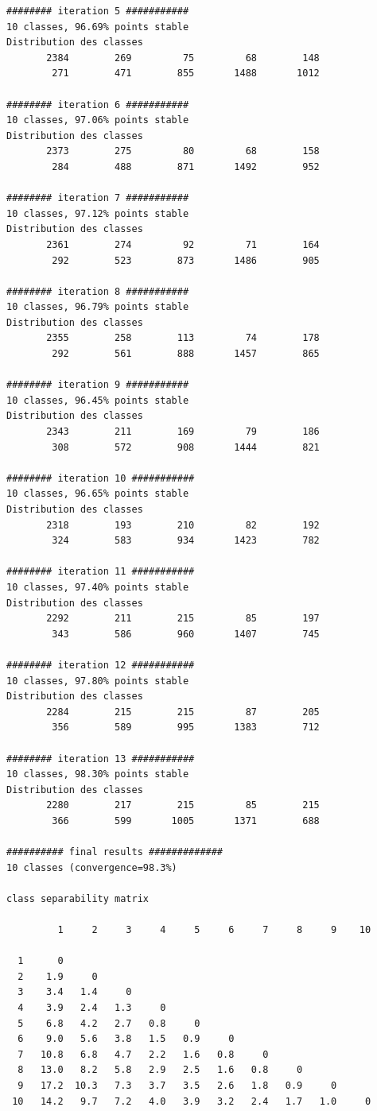 \documentclass[land,article,submit,pdftex,moreauthors]{Definitions/mdpi}
\begin{document}
\begin{scriptsize}
\begin{verbatim}
######## iteration 5 ###########
10 classes, 96.69% points stable
Distribution des classes
       2384        269         75         68        148
        271        471        855       1488       1012

######## iteration 6 ###########
10 classes, 97.06% points stable
Distribution des classes
       2373        275         80         68        158
        284        488        871       1492        952

######## iteration 7 ###########
10 classes, 97.12% points stable
Distribution des classes
       2361        274         92         71        164
        292        523        873       1486        905

######## iteration 8 ###########
10 classes, 96.79% points stable
Distribution des classes
       2355        258        113         74        178
        292        561        888       1457        865

######## iteration 9 ###########
10 classes, 96.45% points stable
Distribution des classes
       2343        211        169         79        186
        308        572        908       1444        821

######## iteration 10 ###########
10 classes, 96.65% points stable
Distribution des classes
       2318        193        210         82        192
        324        583        934       1423        782

######## iteration 11 ###########
10 classes, 97.40% points stable
Distribution des classes
       2292        211        215         85        197
        343        586        960       1407        745

######## iteration 12 ###########
10 classes, 97.80% points stable
Distribution des classes
       2284        215        215         87        205
        356        589        995       1383        712

######## iteration 13 ###########
10 classes, 98.30% points stable
Distribution des classes
       2280        217        215         85        215
        366        599       1005       1371        688

########## final results #############
10 classes (convergence=98.3%)

class separability matrix

         1     2     3     4     5     6     7     8     9    10

  1      0
  2    1.9     0
  3    3.4   1.4     0
  4    3.9   2.4   1.3     0
  5    6.8   4.2   2.7   0.8     0
  6    9.0   5.6   3.8   1.5   0.9     0
  7   10.8   6.8   4.7   2.2   1.6   0.8     0
  8   13.0   8.2   5.8   2.9   2.5   1.6   0.8     0
  9   17.2  10.3   7.3   3.7   3.5   2.6   1.8   0.9     0
 10   14.2   9.7   7.2   4.0   3.9   3.2   2.4   1.7   1.0     0


\end{verbatim}
\end{scriptsize}
\end{document}
